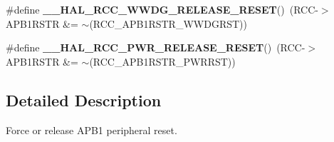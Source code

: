 \begin{DoxyCompactItemize}
\#define {\bfseries \+\_\+\+\_\+\+H\+A\+L\+\_\+\+R\+C\+C\+\_\+\+W\+W\+D\+G\+\_\+\+R\+E\+L\+E\+A\+S\+E\+\_\+\+R\+E\+S\+ET}()~(R\+CC-\/$>$A\+P\+B1\+R\+S\+TR \&= $\sim$(R\+C\+C\+\_\+\+A\+P\+B1\+R\+S\+T\+R\+\_\+\+W\+W\+D\+G\+R\+ST))
\item 
\mbox{\label{group___r_c_c___a_p_b1___force___release___reset_gaaa5a340d38d50e508243f48bbb47dd32}} 
\#define {\bfseries \+\_\+\+\_\+\+H\+A\+L\+\_\+\+R\+C\+C\+\_\+\+P\+W\+R\+\_\+\+R\+E\+L\+E\+A\+S\+E\+\_\+\+R\+E\+S\+ET}()~(R\+CC-\/$>$A\+P\+B1\+R\+S\+TR \&= $\sim$(R\+C\+C\+\_\+\+A\+P\+B1\+R\+S\+T\+R\+\_\+\+P\+W\+R\+R\+ST))
\end{DoxyCompactItemize}


\subsection{Detailed Description}
Force or release A\+P\+B1 peripheral reset. 

